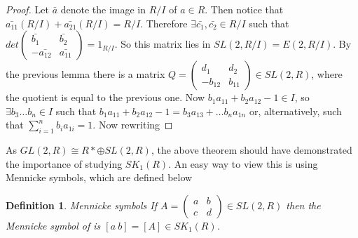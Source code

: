 \documentclass[a4paper,10pt]{article}
\newtheorem{defn}[thm]{Definition}
\begin{document}
\begin{proof}
\newline Let $\bar{a}$ denote the image in $R/I$ of $a\in R$. Then notice that $\bar{a_{11}}(R/I)+\bar{a_{21}}(R/I)=R/I$. Therefore $\exists \bar{c_{1}},\bar{c_{2}}\in R/I$ such that
$det\begin{pmatrix} \bar{b_{1}} & \bar{b_{2}} \\ -\bar{a_{12}} & \bar{a_{11}} \end{pmatrix}=1_{R/I}$. 
So this matrix lies in $SL(2,R/I)=E(2,R/I)$. By the previous lemma there is a matrix
$Q=\begin{pmatrix} d_{1} & d_{2} \\ -b_{12} & b_{11} \end{pmatrix}\in SL(2,R)$, 
where the quotient is equal to the previous one. Now $b_{1}a_{11}+b_{2}a_{12}-1\in I$, so $\exists b_{3}\ldots b_{n}\in I$ such that $b_{1}a_{11}+b_{2}a_{12}-1=b_{3}a_{13}+\ldots b_{n}a_{1n}$ or, alternatively, such that $\sum_{i=1}^{n}b_{i}a_{1i}=1$. Now rewriting 
\end{proof}

As $GL(2,R)\cong R*\oplus SL(2,R)$, the above theorem should have demonstrated the importance of studying $SK_{1}(R)$. An easy way to view this is using Mennicke symbols, which are defined below

\begin{defn}{Mennicke symbols}
If $A=\begin{pmatrix} a & b \\ c & d \end{pmatrix}\in SL(2,R)$ then the Mennicke symbol of is $[a\ b]=[A]\in SK_{1}(R)$.
\end{defn}
\end{document}
